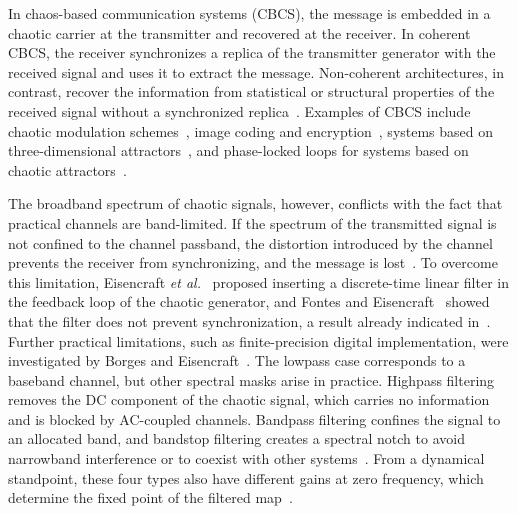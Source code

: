 \documentclass[journal]{IEEEtran}
\begin{document}
In chaos-based communication systems (CBCS), the message is embedded in a
chaotic carrier at the transmitter and recovered at the receiver. In
coherent CBCS, the receiver synchronizes a replica of the transmitter
generator with the received signal and uses it to extract the message.
Non-coherent architectures, in contrast, recover the information from
statistical or structural properties of the received signal without a
synchronized replica~\cite{Kaddoum2016}. Examples of CBCS include chaotic
modulation schemes~\cite{Baptista2021}, image coding and
encryption~\cite{Sabatini2020}, systems based on three-dimensional
attractors~\cite{Souza2019}, and phase-locked loops for systems based on
chaotic attractors~\cite{Silva2025sbrt}.

The broadband spectrum of chaotic signals, however, conflicts with the fact
that practical channels are band-limited. If the spectrum of the transmitted
signal is not confined to the channel passband, the distortion introduced by
the channel prevents the receiver from synchronizing, and the message is
lost~\cite{Eisencraft2011}. To overcome this limitation, Eisencraft
\textit{et al.}~\cite{Eisencraft2009} proposed inserting a discrete-time
linear filter in the feedback loop of the chaotic generator, and Fontes and
Eisencraft~\cite{Fontes2016} showed that the filter does not prevent
synchronization, a result already indicated in~\cite{Eisencraft2009}.
Further practical limitations, such as finite-precision digital
implementation, were investigated by Borges and
Eisencraft~\cite{Borges2021sbrt}. The lowpass case corresponds to a baseband
channel, but other spectral masks arise in practice. Highpass filtering
removes the DC component of the chaotic signal, which carries no information
and is blocked by AC-coupled channels. Bandpass filtering confines the signal
to an allocated band, and bandstop filtering creates a spectral notch to
avoid narrowband interference or to coexist with other
systems~\cite{Li2013uwb}. From a dynamical standpoint, these four types also have different
gains at zero frequency, which determine the fixed point of the filtered
map~\cite{BorgesCNSNS2024}.
\end{document}
